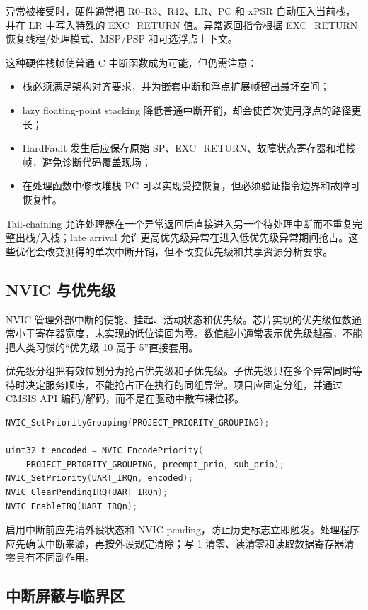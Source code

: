 异常被接受时，硬件通常把 R0--R3、R12、LR、PC 和 xPSR 自动压入当前栈，并在 LR 中写入特殊的 EXC\_RETURN 值。异常返回指令根据 EXC\_RETURN 恢复线程/处理模式、MSP/PSP 和可选浮点上下文。

这种硬件栈帧使普通 C 中断函数成为可能，但仍需注意：
\begin{itemize}
  \item 栈必须满足架构对齐要求，并为嵌套中断和浮点扩展帧留出最坏空间；
  \item lazy floating-point stacking 降低普通中断开销，却会使首次使用浮点的路径更长；
  \item HardFault 发生后应保存原始 SP、EXC\_RETURN、故障状态寄存器和堆栈帧，避免诊断代码覆盖现场；
  \item 在处理函数中修改堆栈 PC 可以实现受控恢复，但必须验证指令边界和故障可恢复性。
\end{itemize}

Tail-chaining 允许处理器在一个异常返回后直接进入另一个待处理中断而不重复完整出栈/入栈；late arrival 允许更高优先级异常在进入低优先级异常期间抢占。这些优化会改变测得的单次中断开销，但不改变优先级和共享资源分析要求。

\subsection{NVIC 与优先级}

NVIC 管理外部中断的使能、挂起、活动状态和优先级。芯片实现的优先级位数通常小于寄存器宽度，未实现的低位读回为零。数值越小通常表示优先级越高，不能把人类习惯的“优先级 10 高于 5”直接套用。

优先级分组把有效位划分为抢占优先级和子优先级。子优先级只在多个异常同时等待时决定服务顺序，不能抢占正在执行的同组异常。项目应固定分组，并通过 CMSIS API 编码/解码，而不是在驱动中散布裸位移。

\begin{lstlisting}[language=C,caption={中断优先级配置的边界检查}]
NVIC_SetPriorityGrouping(PROJECT_PRIORITY_GROUPING);

uint32_t encoded = NVIC_EncodePriority(
    PROJECT_PRIORITY_GROUPING, preempt_prio, sub_prio);
NVIC_SetPriority(UART_IRQn, encoded);
NVIC_ClearPendingIRQ(UART_IRQn);
NVIC_EnableIRQ(UART_IRQn);
\end{lstlisting}

启用中断前应先清外设状态和 NVIC pending，防止历史标志立即触发。处理程序应先确认中断来源，再按外设规定清除；写 1 清零、读清零和读取数据寄存器清零具有不同副作用。

\subsection{中断屏蔽与临界区}

